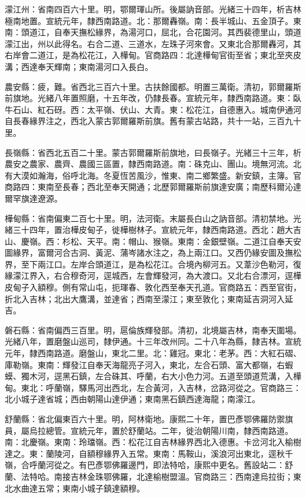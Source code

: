\begin{pinyinscope}
濛江州：省南四百六十里。明，鄂爾琿山所。後屬訥音部。光緒三十四年，析吉林極南地置。宣統元年，隸西南路道。北：那爾轟嶺。南：長半城山、五金頂子。東南：頭道江，自奉天撫松緣界，為湯河口，屈北，合花園河。其西裴德里山，頭道濛江出，州以此得名。右合二道、三道水，左珠子河來會。又東北合那爾轟河，其右岸會二道江，是為松花江，入樺甸。官商路四：北達樺甸官街至省；東北至夾皮溝；西達奉天輝南；東南湯河口入長白。

農安縣：疲，難。省西北三百六十里。古扶餘國都。明置三萬衛。清初，郭爾羅斯前旗地。光緒八年置照磨，十五年改，仍隸長春。宣統元年，隸西南路道。東：臥牛石山、紅石砑。西：太平嶺、伏山、大青。東：松花江，自德惠入。城南伊通河自長春緣界注之，西北入蒙古郭爾羅斯前旗。舊有蒙古站路，共十一站，三百九十里。

長嶺縣：省西北五百二十里。蒙古郭爾羅斯前旗地，曰長嶺子。光緒三十三年，析農安之農家、農齊、農國三區置，隸西南路道。南：硃克山、團山。境無河流。北有大漠如瀚海，俗呼北海。冬夏恆苦風沙，惟東、南二鄉繁盛。新安鎮，主簿。官商路四：東南至長春；西北至奉天開通；北歷郭爾羅斯前旗達安廣；南歷科爾沁達爾罕旗達遼源。

樺甸縣：省南偏東二百七十里。明，法河衛。末屬長白山之訥音部。清初禁地。光緒三十四年，置治樺皮甸子，徙樺樹林子。宣統元年，隸西南路道。西北：趙大吉山、慶嶺。西：杉松、天平。南：帽山、猴嶺。東南：金銀壁嶺。二道江自奉天安圖緣界，富爾河合古洞、黃泥、蒲岑諸水注之，為上兩江口。又西仍緣安圖及撫松界，至下兩江口。左岸合頭道江，是為松花江。合境內柳河五。又葦沙色勒河，復緣濛江界入，右合穆奇河，逕城西，左會輝發河，為大渡口。又北右合漂河，逕樺皮甸子入額穆。側有常山屯，扼琿春、敦化西至奉天孔道。官商路五：西至官街，折北入吉林；北出大鷹溝，並達省；西南至濛江；東至敦化；東南延吉洞河入延吉。

磐石縣：省南偏西三百里。明，扈倫族輝發部。清初，北境屬吉林，南奉天圍場。光緒八年，置磨盤山巡司，隸伊通。十三年改州同。二十八年為縣，隸吉林。宣統元年，隸西南路道。磨盤山，東北二里。北：雞冠。東北：老茅。西：大紅石磖、庫勒嶺。東南：輝發江自奉天海龍亮子河入，東北，左合石頭、富大都嶺，右蝦蟆、獨木河，逕黑石鎮，左合硃其、呼蘭，右大小色力河。五道至頭道荒溝，入樺甸。東北：呼蘭嶺，驛馬河出西北，左合黃河，入吉林，岔路河從之。官商路三：北小城子達省城；西由朝陽山達伊通；東南黑石鎮西達海龍；南濛江。

舒蘭縣：省北偏東百六十里。明，阿林衛地。康熙二十年，置巴彥鄂佛羅防禦旗員，屬烏拉總管。宣統元年，置於舒蘭站。二年，徙治朝陽川南，隸西南路道。南：北慶嶺。東南：玲璫嶺。西：松花江自吉林緣界西北入德惠。卡岔河北入榆樹達之。東：蘭陵河，自額穆緣界入五常。東南：馬鞍山，溪浪河出東北，逕秋千嶺，合呼蘭河從之。有巴彥鄂佛羅邊門，即法特哈，康熙中更名。舊設站二：舒蘭、法特哈。南接吉林金珠鄂佛羅，北達榆樹盟溫。官商路三：西南達烏拉街；東北水曲達五常；東南小城子鎮達額穆。


\end{pinyinscope}
